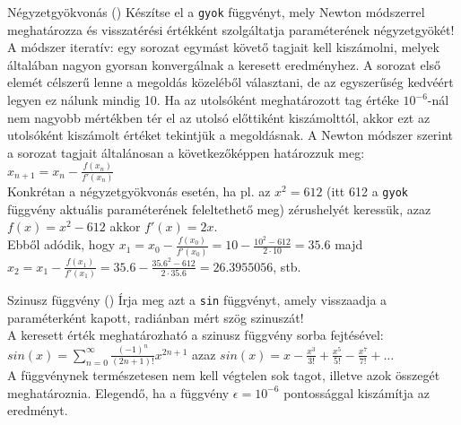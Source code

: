 \documentclass[usenames,dvipsnames,aspectratio=169]{beamer}
\begin{document}
\begin{frame}
    \begin{exampleblock}{Négyzetgyökvonás ()}
        \small
        Készítse el a \texttt{gyok} függvényt, mely Newton módszerrel meghatározza és visszatérési értékként szolgáltatja paraméterének négyzetgyökét! \\
        A módszer iteratív: egy sorozat egymást követő tagjait kell kiszámolni, melyek általában nagyon gyorsan konvergálnak a keresett eredményhez. A sorozat első elemét célszerű lenne a megoldás közeléből választani, de az egyszerűség kedvéért legyen ez nálunk mindig 10. Ha az utolsóként meghatározott tag értéke \( 10^{-6} \)-nál nem nagyobb mértékben tér el az utolsó előttiként kiszámolttól, akkor ezt az utolsóként kiszámolt értéket tekintjük a megoldásnak. A Newton módszer szerint a sorozat tagjait általánosan a következőképpen határozzuk meg: \( x_{n+1} = x_n - \frac{f(x_n)}{f'(x_n)} \) \\
        Konkrétan a négyzetgyökvonás esetén, ha pl. az \( x^2 = 612 \) (itt 612 a \texttt{gyok} függvény aktuális paraméterének feleltethető meg) zérushelyét keressük, azaz \( f(x) = x^2 - 612 \) akkor \( f'(x) = 2x \). \\
        Ebből adódik, hogy \( x_1 = x_0 - \frac{f(x_0)}{f'(x_0)} = 10 - \frac{10^2 - 612}{2 \cdot 10} = 35.6 \) majd \( x_2 = x_1 - \frac{f(x_1)}{f'(x_1)} = 35.6 - \frac{35.6^2 - 612}{2 \cdot 35.6} = 26.3955056 \), stb.
    \end{exampleblock}
\end{frame}

\begin{frame}
    \begin{exampleblock}{Szinusz függvény ()}
        Írja meg azt a \texttt{sin} függvényt, amely visszaadja a paraméterként kapott, radiánban mért szög szinuszát!\\
        \smallskip
        A keresett érték meghatározható a szinusz függvény sorba fejtésével: \( sin(x) = \sum_{n=0}^\infty \frac{(-1)^n}{(2n+1)!} x^{2n+1} \) azaz \( sin(x) = x-\frac{x^3}{3!}+\frac{x^5}{5!}-\frac{x^7}{7!}+\dots \)\\
        \smallskip
        A függvénynek természetesen nem kell végtelen sok tagot, illetve azok összegét meghatároznia. Elegendő, ha a függvény \( \epsilon = 10^{-6} \) pontossággal kiszámítja az eredményt.
    \end{exampleblock}
\end{frame}
\end{document}
